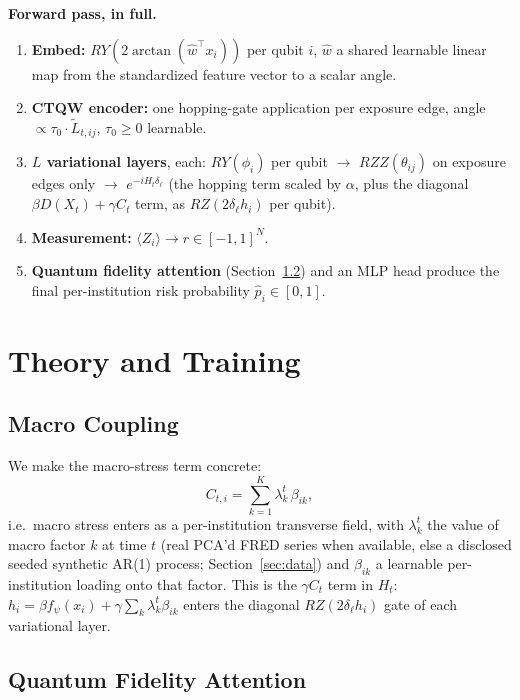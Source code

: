 \documentclass[journal]{IEEEtran}
\begin{document}
\textbf{Forward pass, in full.}
\begin{enumerate}
  \item \textbf{Embed:} $RY(2\arctan(\hat w^\top x_i))$ per qubit $i$,
        $\hat w$ a shared learnable linear map from the standardized
        feature vector to a scalar angle.
  \item \textbf{CTQW encoder:} one hopping-gate application per exposure
        edge, angle $\propto \tau_0 \cdot \tilde{L}_{t,ij}$, $\tau_0 \ge
        0$ learnable.
  \item \textbf{$L$ variational layers}, each: $RY(\phi_i)$ per
        qubit $\to$ $RZZ(\theta_{ij})$ on exposure edges only $\to$
        $e^{-i H_t \delta_\ell}$ (the hopping term scaled by $\alpha$,
        plus the diagonal $\beta D(X_t) + \gamma C_t$ term, as
        $RZ(2\delta_\ell h_i)$ per qubit).
  \item \textbf{Measurement:} $\langle Z_i \rangle \to r \in [-1,1]^N$.
  \item \textbf{Quantum fidelity attention} (Section~\ref{sec:attention})
        and an MLP head produce the final per-institution risk
        probability $\hat p_i \in [0,1]$.
\end{enumerate}

\section{Theory and Training}

\subsection{Macro Coupling}
\label{sec:macro}

We make the macro-stress term concrete:
\begin{equation}
  C_{t,i} = \sum_{k=1}^{K} \lambda_k^t\, \beta_{ik},
\end{equation}
i.e.\ macro stress enters as a per-institution transverse field, with
$\lambda_k^t$ the value of macro factor $k$ at time $t$ (real
PCA'd FRED series when available, else a disclosed seeded synthetic
AR(1) process; Section~\ref{sec:data}) and $\beta_{ik}$ a learnable
per-institution loading onto that factor. This is the $\gamma C_t$ term
in $H_t$: $h_i = \beta f_\psi(x_i) + \gamma \sum_k \lambda_k^t \beta_{ik}$
enters the diagonal $RZ(2\delta_\ell h_i)$ gate of each variational
layer.

\subsection{Quantum Fidelity Attention}
\label{sec:attention}
\end{document}
